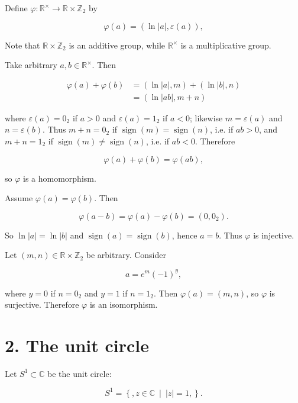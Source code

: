 Define \(\varphi:\mathbb{R}^{\times}\rightarrow\mathbb{R} \times \mathbb{Z}_{2}\) by

\[\varphi(a) = \left( {\ln|a|,\varepsilon(a)} \right),\]

Note that \(\mathbb{R} \times \mathbb{Z}_{2}\) is an additive group, while \(\mathbb{R}^{\times}\) is a multiplicative group.

Take arbitrary \(a,b \in \mathbb{R}^{\times}\). Then

\[\begin{matrix}
{\varphi(a) + \varphi(b)} & {= \left( {\ln|a|,m} \right) + \left( {\ln|b|,n} \right)} \\
 & {= \left( {\ln\left| {ab} \right|,m + n} \right)}
\end{matrix}\]

where \(\varepsilon(a) = 0_{2}\) if \(a > 0\) and \(\varepsilon(a) = 1_{2}\) if \(a < 0\); likewise \(m = \varepsilon(a)\) and \(n = \varepsilon(b)\). Thus \(m + n = 0_{2}\) if \(\operatorname{sign}(m) = \operatorname{sign}(n)\), i.e. if \(ab > 0\), and \(m + n = 1_{2}\) if \(\operatorname{sign}(m) \neq \operatorname{sign}(n)\), i.e. if \(ab < 0\). Therefore

\[\varphi(a) + \varphi(b) = \varphi\left( {ab} \right),\]

so \(\varphi\) is a homomorphism.

Assume \(\varphi(a) = \varphi(b)\). Then

\[\varphi\left( {a - b} \right) = \varphi(a) - \varphi(b) = \left( {0,0_{2}} \right).\]

So \(\ln|a| = \ln|b|\) and \(\operatorname{sign}(a) = \operatorname{sign}(b)\), hence \(a = b\). Thus \(\varphi\) is injective.

Let \(\left( {m,n} \right) \in \mathbb{R} \times \mathbb{Z}_{2}\) be arbitrary. Consider

\[a = e^{m}\left( {- 1} \right)^{y},\]

where \(y = 0\) if \(n = 0_{2}\) and \(y = 1\) if \(n = 1_{2}\). Then \(\varphi(a) = \left( {m,n} \right)\), so \(\varphi\) is surjective. Therefore \(\varphi\) is an isomorphism.

\section{2. The unit circle}

Let \(S^{1} \subset \mathbb{C}\) be the unit circle:

\[S^{1} = \left\{ ,z \in \mathbb{C}\  \middle| \ |z| = 1, \right\}.\]

